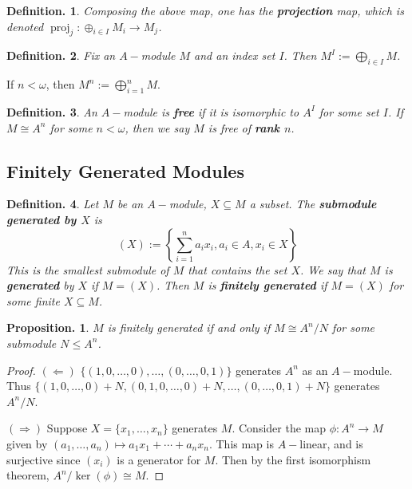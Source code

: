 \documentclass[11pt, a4paper]{memoir}
\theoremstyle{change}
\newtheorem{proposition}[theorem]{Proposition.}
\theoremstyle{plain}
\theoremstyle{nonumberplain}
\newtheorem{definition}{Definition.}
\newtheorem{proof}{Proof}
\DeclareMathOperator{\proj}{proj}
\numberwithin{equation}{section}
\begin{document}
\begin{definition}
    Composing the above map, one has the \textbf{projection} map, which is denoted $\proj_j:\oplus_{i\in I}M_i\to M_j$.
\end{definition}
\begin{definition}
    Fix an $A-$module $M$ and an index set $I$.
    Then $M^I:=\bigoplus_{i\in I}M$.
\end{definition}
If $n<\omega$, then $M^n:=\bigoplus_{i=1}^n M$.
\begin{definition}
    An $A-$module is \textbf{free} if it is isomorphic to $A^I$ for some set $I$.
    If $M\cong A^n$ for some $n<\omega$, then we say $M$ is free of \textbf{rank $n$}.
\end{definition}
\subsection{Finitely Generated Modules}
\begin{definition}
    Let $M$ be an $A-$module, $X\subseteq M$ a subset.
    The \textbf{submodule generated by $X$} is
    \begin{equation*}
        (X):=\left\{\sum\limits_{i=1}^n a_ix_i,a_i\in A,x_i\in X\right\}
    \end{equation*}
    This is the smallest submodule of $M$ that contains the set $X$.
    We say that $M$ is \textbf{generated} by $X$ if $M=(X)$.
    Then $M$ is \textbf{finitely generated} if $M=(X)$ for some finite $X\subseteq M$.
\end{definition}
\begin{proposition}
    $M$ is finitely generated if and only if $M\cong A^n/N$ for some submodule $N\leq A^n$.
\end{proposition}
\begin{proof}
    $(\Leftarrow)$ $\{(1,0,\ldots,0),\ldots,(0,\ldots,0,1)\}$ generates $A^n$ as an $A-$module.
    Thus $\{(1,0,\ldots,0)+N,(0,1,0,\ldots,0)+N,\ldots,(0,\ldots,0,1)+N\}$ generates $A^n/N$.

    $(\Rightarrow)$ Suppose $X=\{x_1,\ldots,x_n\}$ generates $M$.
    Consider the map $\phi:A^n\to M$ given by $(a_1,\ldots,a_n)\mapsto a_1x_1+\cdots+a_nx_n$.
    This map is $A-$linear, and is surjective since $(x_i)$ is a generator for $M$.
    Then by the first isomorphism theorem, $A^n/\ker(\phi)\cong M$.
\end{proof}
\end{document}
